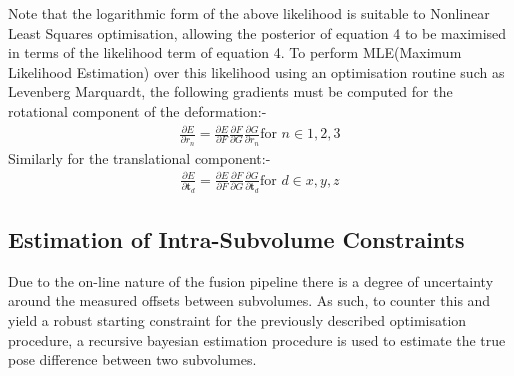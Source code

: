 Note that the logarithmic form of the above likelihood is suitable to Nonlinear Least Squares optimisation, allowing the posterior of equation 4 
to be maximised in terms of the likelihood term of equation 4. To perform MLE(Maximum Likelihood Estimation) over this likelihood using 
an optimisation routine such as Levenberg Marquardt, the following gradients must be computed for the rotational component of the 
deformation:-
\begin{equation}
\begin{split}
\frac{\partial E}{\partial r_{n}} = \frac{\partial E}{\partial F} \frac{\partial F}{\partial G} \frac{\partial G}{\partial r_{n}} \text{for } n \in {1,2,3}
\end{split}
\end{equation}
Similarly for the translational component:-
\begin{equation}
\begin{split}
\frac{\partial E}{\partial \mathbf{t}_{d}} = \frac{\partial E}{\partial F} \frac{\partial F}{\partial G} \frac{\partial G}{\partial \mathbf{t}_{d}} \text{for } d \in {x,y,z}
\end{split}
\end{equation}

\subsection{Estimation of Intra-Subvolume Constraints}
Due to the on-line nature of the fusion pipeline there is a degree of uncertainty around the measured offsets between subvolumes. As such, to 
counter this and yield a robust starting constraint for the previously described optimisation procedure, a recursive bayesian estimation 
procedure is used to estimate the true pose difference between two subvolumes.

